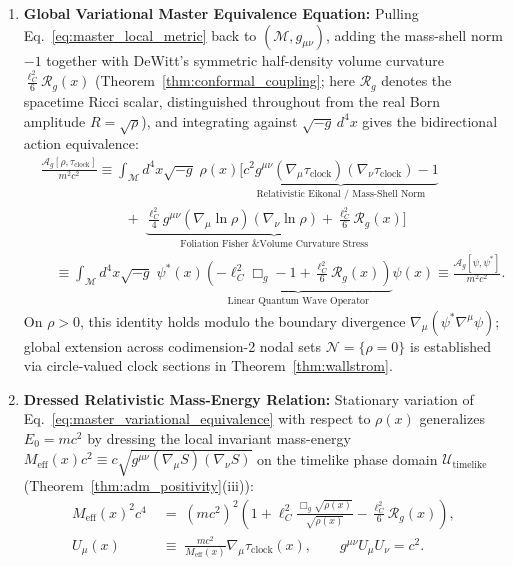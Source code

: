 \documentclass[11pt, a4paper]{article}
\theoremstyle{definition}
\begin{document}
\begin{enumerate}[label=\textbf{(\Roman*)}, leftmargin=1.2cm]
    \item \textbf{Global Variational Master Equivalence Equation:} Pulling Eq.~\eqref{eq:master_local_metric} back to $(\mathcal{M}, g_{\mu\nu})$, adding the mass-shell norm $-1$ together with DeWitt's symmetric half-density volume curvature $\frac{\ell_C^2}{6}\mathcal{R}_g(x)$ (Theorem~\ref{thm:conformal_coupling}; here $\mathcal{R}_g$ denotes the spacetime Ricci scalar, distinguished throughout from the real Born amplitude $R = \sqrt{\rho}$), and integrating against $\sqrt{-g}\,d^4x$ gives the bidirectional action equivalence:
    \begin{equation}
    \label{eq:master_variational_equivalence}
    \boxed{
    \begin{aligned}
    &\frac{\mathcal{A}_g[\rho, \tau_{\text{clock}}]}{m^2 c^2} \equiv \int_{\mathcal{M}} d^4x\sqrt{-g}\;\rho(x) \Bigg[ \underbrace{c^2 g^{\mu\nu}(\nabla_\mu \tau_{\text{clock}})(\nabla_\nu \tau_{\text{clock}}) - 1}_{\text{Relativistic Eikonal / Mass-Shell Norm}} \\
    &\qquad\qquad\qquad +\; \underbrace{\frac{\ell_C^2}{4} g^{\mu\nu}(\nabla_\mu \ln\rho)(\nabla_\nu \ln\rho) + \frac{\ell_C^2}{6}\mathcal{R}_g(x)}_{\text{Foliation Fisher \& Volume Curvature Stress}} \Bigg] \\
    &\quad \equiv \int_{\mathcal{M}} d^4x\sqrt{-g}\;\psi^*(x)\!\underbrace{\left( -\ell_C^2 \Box_g - 1 + \frac{\ell_C^2}{6}\mathcal{R}_g(x) \right)}_{\text{Linear Quantum Wave Operator}}\!\psi(x) \equiv \frac{\mathcal{A}_g[\psi, \psi^*]}{m^2 c^2}.
    \end{aligned}
    }
    \end{equation}
    On $\rho > 0$, this identity holds modulo the boundary divergence $\nabla_\mu(\psi^*\nabla^\mu\psi)$; global extension across codimension-2 nodal sets $\mathcal{N} = \{\rho = 0\}$ is established via circle-valued clock sections in Theorem~\ref{thm:wallstrom}.

    \item \textbf{Dressed Relativistic Mass-Energy Relation:} Stationary variation of Eq.~\eqref{eq:master_variational_equivalence} with respect to $\rho(x)$ generalizes $E_0 = mc^2$ by dressing the local invariant mass-energy $M_{\text{eff}}(x)c^2 \equiv c\sqrt{g^{\mu\nu}(\nabla_\mu S)(\nabla_\nu S)}$ on the timelike phase domain $\mathcal{U}_{\text{timelike}}$ (Theorem~\ref{thm:adm_positivity}(iii)):
    \begin{equation}
    \label{eq:master_dressed_mass}
    \boxed{
    \begin{aligned}
    M_{\text{eff}}(x)^2 c^4 &\;=\; (mc^2)^2 \left( 1 + \ell_C^2 \frac{\Box_g \sqrt{\rho(x)}}{\sqrt{\rho(x)}} - \frac{\ell_C^2}{6}\mathcal{R}_g(x) \right), \\
    U_\mu(x) &\;\equiv\; \frac{m c^2}{M_{\text{eff}}(x)}\nabla_\mu \tau_{\text{clock}}(x), \qquad g^{\mu\nu}U_\mu U_\nu = c^2.
    \end{aligned}
    }
    \end{equation}
\end{enumerate}
\end{document}
